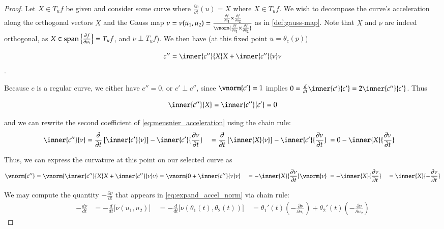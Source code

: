 	\begin{proof}
	Let $X\in T_u f$ be given and consider some curve where $\frac{\partial c}{\partial t}(u) = X$ where $X \in T_u f$. We wish to decompose the curve's acceleration along the  orthogonal vectors $X$ and
	the Gauss map $\nu = \nu(u_1, u_2) =
		\frac{\frac{\partial f}{\partial u_1} \times \frac{\partial f}{\partial u_2}}
		{\vnorm{\frac{\partial f}{\partial u_1} \times \frac{\partial f}{\partial u_2}}}$ as in \cref{def:gauss-map}.
		Note that $X$ and $\nu$ are indeed orthogonal,
		as $ X \in \mathrm{span}\left\{\frac{\partial f}{\partial u_i}\right\} = T_u f$, and
		$\nu \perp T_u f$).
	 We then have (at this fixed point $u=\theta_c(p)$)
		
		\begin{equation} \label{eq:meusnier_acceleration}
			c'' = \inner{c''}{X} X + \inner{c''}{\nu}\nu
			\end{equation}. 
	
	Because $c$ is a regular curve, we either have $c''=0$,
	or $c' \perp c''$, since $\vnorm{c'} = 1$ implies
	$0 = \frac{d}{dt} \inner{c'}{c'} = 2 \inner{c''}{c'} $. Thus
	
		\[ \inner{c''}{X} = \inner{c''}{c'} = 0 \]

	
	 and we can rewrite the second coefficient of \cref{eq:meusnier_acceleration} using the chain rule: %
	\begin{align}
		\inner{c''}{\nu} &=
		\frac{\partial}{\partial t}\left[ \inner{c'}{\nu} \right]
			- \inner{c'}{\frac{\partial \nu}{\partial t}} \
			&= \frac{\partial}{\partial t}\left[ \inner{X}{\nu} \right]
			- \inner{c'}{\frac{\partial \nu}{\partial t}} \
			&= 0 - \inner{X}{\frac{\partial \nu}{\partial t}}
			\end{align}
	
	Thus, we can express the curvature at this point on our selected curve as
	\begin{align}
	\vnorm{c''} = \vnorm{\inner{c''}{X} X + \inner{c''}{\nu}\nu}
	&= \vnorm{0 + \inner{c''}{\nu}\nu} \
	&= - \inner{X}{\frac{\partial \nu}{\partial t}}\vnorm{\nu} \
	&= - \inner{X}{\frac{\partial \nu}{\partial t}} \
	&=  \inner{X}{-\frac{\partial \nu}{\partial t}} \label{eq:expand_accel_norm}
	\end{align}
	
	We may compute the quantity $-\frac{\partial \nu}{\partial t}$ that appears in
	\cref{eq:expand_accel_norm} via chain rule:
	\begin{align} \label{gaussmap_timederivative}
	-\frac{d \nu}{dt} &= -\frac{d}{dt}\big[\nu(u_1, u_2)\big] \
	&= -\frac{d}{dt}\big[\nu(\theta_1(t), \theta_2(t))\big] \
	&= \theta_1'(t)\left( - \frac{\partial \nu}{\partial u_1} \right) + 
	\theta_2'(t)\left( - \frac{\partial \nu}{\partial u_2} \right) \label{eq:gaussmap_dt_expanded}
	\end{align}
	

\end{proof}
